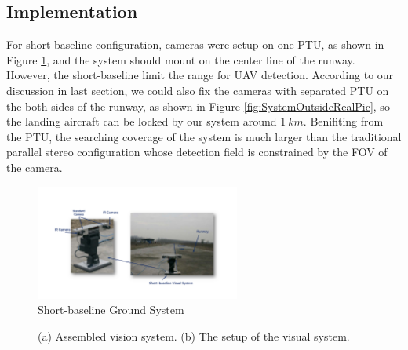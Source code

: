 \documentclass[journal,article,submit,moreauthors,pdftex,10pt,a4paper]{mdpi}
\begin{document}
\subsection{Implementation}
For short-baseline configuration, cameras were setup on one PTU, as shown in Figure  \ref{fig:chp08_18_ground_short_ptus}, and the system should mount on the center line of the runway. However, the short-baseline limit the range for UAV detection. According to our discussion in last section, we could also fix the cameras with separated PTU on the both sides of the runway, as shown in Figure  \ref{fig:SystemOutsideRealPic}, so the landing aircraft can be locked by our system around $1\ km$. Benifiting from the PTU, the searching coverage of the system is much larger than the traditional parallel stereo configuration whose detection field is constrained by the FOV of the camera.


\begin{figure}[!ht]
	\centering
	\includegraphics[width=0.6\textwidth]{Figs/chp08_18_ground_short_ptus.pdf}	
	\caption{Short-baseline Ground System}
	\label{fig:chp08_18_ground_short_ptus}
\end{figure}


\begin{figure}[!tb]
	\centering
	\caption{(a) Assembled vision system. (b) The setup of the visual system.}
\end{figure}
%
\end{document}

